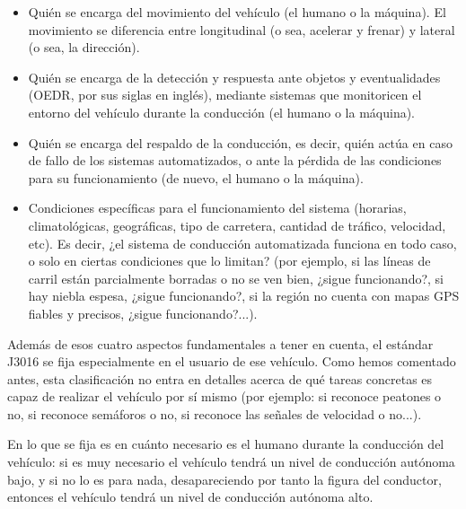 \documentclass{pclass}
\begin{document}
\begin{itemize}
	\item Quién se encarga del movimiento del vehículo (el humano o la máquina). El movimiento se diferencia entre longitudinal (o sea, acelerar y frenar) y lateral (o sea, la dirección).
	
	\item Quién se encarga de la detección y respuesta ante objetos y eventualidades (OEDR, por sus siglas en inglés), mediante sistemas que monitoricen el entorno del vehículo durante la conducción (el humano o la máquina).
	
	\item Quién se encarga del respaldo de la conducción, es decir, quién actúa en caso de fallo de los sistemas automatizados, o ante la pérdida de las condiciones para su funcionamiento (de nuevo, el humano o la máquina).
	
	\item Condiciones específicas para el funcionamiento del sistema (horarias, climatológicas, geográficas, tipo de carretera, cantidad de tráfico, velocidad, etc). Es decir, ¿el sistema de conducción automatizada funciona en todo caso, o solo en ciertas condiciones que lo limitan? (por ejemplo, si las líneas de carril están parcialmente borradas o no se ven bien, ¿sigue funcionando?, si hay niebla espesa, ¿sigue funcionando?, si la región no cuenta con mapas GPS fiables y precisos, ¿sigue funcionando?...). 
	
\end{itemize}

Además de esos cuatro aspectos fundamentales a tener en cuenta, el estándar J3016 se fija especialmente en el usuario de ese vehículo. Como hemos comentado antes, esta clasificación no entra en detalles acerca de qué tareas concretas es capaz de realizar el vehículo por sí mismo (por ejemplo: si reconoce peatones o no, si reconoce semáforos o no, si reconoce las señales de velocidad o no...).

En lo que se fija es en cuánto necesario es el humano durante la conducción del vehículo: si es muy necesario el vehículo tendrá un nivel de conducción autónoma bajo, y si no lo es para nada, desapareciendo por tanto la figura del conductor, entonces el vehículo tendrá un nivel de conducción autónoma alto.
\end{document}
